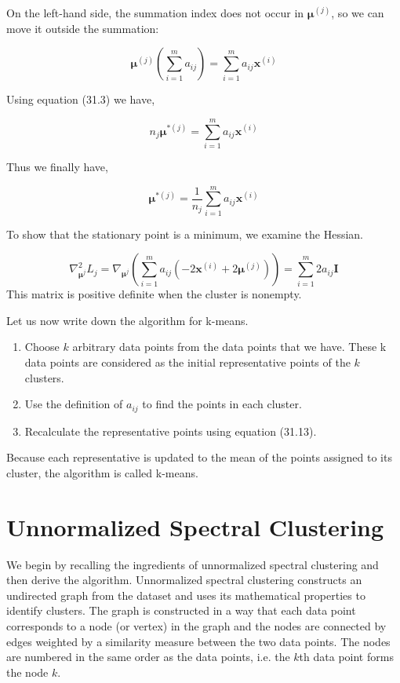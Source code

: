 \documentclass[english]{article}
\theoremstyle{plain}
\begin{document}
On the left-hand side, the summation index does not occur in $\boldsymbol{\mu}^{(j)}$, so we can move it outside the summation:

\begin{equation}
\boldsymbol{\mu}^{(j)}
\left( \sum_{i=1}^{m} a_{ij} \right)   = \sum_{i=1}^{m} a_{ij}\boldsymbol{x}^{(i)}
\end{equation}

Using equation (31.3) we have,

\begin{equation}
n_{j}\boldsymbol{\mu}^{*(j)} = \sum_{i=1}^{m} a_{ij}\boldsymbol{x}^{(i)}
\end{equation}

Thus we finally have,

\begin{equation}
\boldsymbol{\mu}^{*(j)} = \frac{1}{n_{j}} \sum_{i=1}^{m} a_{ij}\boldsymbol{x}^{(i)} 
\end{equation}

To show that the stationary point is a minimum, we examine the Hessian. 

\begin{equation}
\nabla_{\boldsymbol{\mu}^{j}}^{2} L_{j} = \nabla_{\boldsymbol{\mu}^{j}} \left(\sum_{i=1}^{m} a_{ij} (-2\boldsymbol{x}^{(i)}+ 2\boldsymbol{\mu}^{(j)})\right)= \sum_{i=1}^{m} 2a_{ij} \boldsymbol{I}
\end{equation}
This matrix is positive definite when the cluster is nonempty.

Let us now write down the algorithm for k-means. 
\begin{enumerate}
\item Choose $k$ arbitrary data points from the data points that we have. These k data points are considered as the initial representative points of the $k$ clusters.
\item Use the definition of $a_{ij}$ to find the points in each cluster.
\item Recalculate the representative points using equation (31.13).
\end{enumerate}

Because each representative is updated to the mean of the points assigned to its cluster, the algorithm is called k-means.

\section{Unnormalized Spectral Clustering}

We begin by recalling the ingredients of unnormalized spectral clustering and then derive the algorithm. Unnormalized spectral clustering constructs an undirected graph from the dataset and uses its mathematical properties to identify clusters. The graph is constructed in a way that each data point corresponds to a node (or vertex) in the graph and the nodes are connected by edges weighted by a similarity measure between the two data points. The nodes are numbered in the same order as the data points, i.e. the $k$th data point forms the node $k$.
\end{document}
